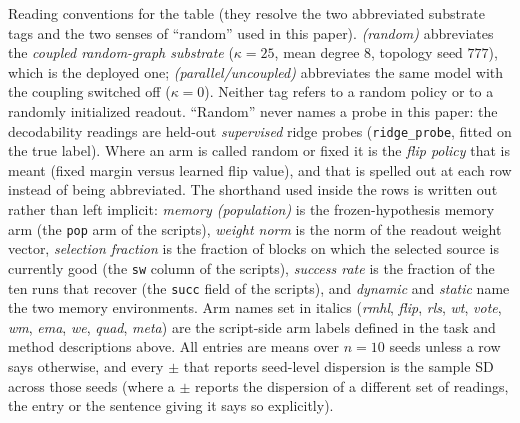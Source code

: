 \documentclass[preprint,12pt]{elsarticle}
\begin{document}
Reading conventions for the table (they resolve the two abbreviated substrate
tags and the two senses of ``random'' used in this paper). \textit{(random)}
abbreviates the \emph{coupled random-graph substrate} ($\kappa=25$, mean
degree $8$, topology seed $777$), which is the deployed one;
\textit{(parallel/uncoupled)} abbreviates the same model with the coupling
switched off ($\kappa=0$). Neither tag refers to a random policy or to a
randomly initialized readout. ``Random'' never names a probe in this paper:
the decodability readings are held-out \emph{supervised} ridge probes
(\texttt{ridge\_probe}, fitted on the true label). Where an arm is called
random or fixed it is the \emph{flip policy} that is meant (fixed margin
versus learned flip value), and that is spelled out at each row instead of
being abbreviated. The shorthand used inside the rows is written out rather
than left implicit: \textit{memory (population)} is the frozen-hypothesis
memory arm (the \texttt{pop} arm of the scripts), \textit{weight norm} is the
norm of the readout weight vector, \textit{selection fraction} is the fraction
of blocks on which the selected source is currently good (the \texttt{sw}
column of the scripts), \textit{success rate} is the fraction of the ten runs
that recover (the \texttt{succ} field of the scripts), and \textit{dynamic} and
\textit{static} name the two memory environments. Arm names set in italics
(\textit{rmhl}, \textit{flip}, \textit{rls}, \textit{wt}, \textit{vote},
\textit{wm}, \textit{ema}, \textit{we}, \textit{quad}, \textit{meta}) are the
script-side arm labels defined in the task and method descriptions above. All
entries are means over $n=10$ seeds unless a row says
otherwise, and every $\pm$ that reports seed-level dispersion is the sample SD across those seeds (where a $\pm$ reports the dispersion of a different set of readings, the entry or the sentence giving it says so explicitly).
\end{document}
